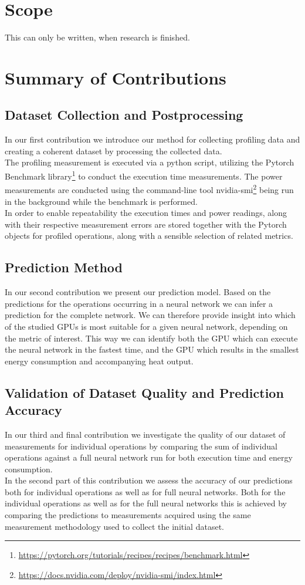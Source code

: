 \section{Scope}
This can only be written, when research is finished.


\section{Summary of Contributions}
\subsection{Dataset Collection and Postprocessing}
In our first contribution we introduce our method for collecting 
profiling data and creating a coherent dataset by processing the 
collected data.\\
The profiling measurement is executed via a python script, utilizing
the Pytorch Benchmark 
library\footnote{\url{https://pytorch.org/tutorials/recipes/recipes/benchmark.html}}
to conduct the execution time measurements. The power measurements
are conducted using the command-line tool 
nvidia-smi\footnote{\url{https://docs.nvidia.com/deploy/nvidia-smi/index.html}}
being run in the background while the benchmark is performed.\\
In order to enable repeatability the execution times and power readings,
along with their respective measurement errors are stored together with the
Pytorch objects for profiled operations, along with a sensible selection of
related metrics.

\subsection{Prediction Method}
In our second contribution we present our prediction model. Based on the predictions
for the operations occurring in a neural network we can infer a prediction for the 
complete network. We can therefore provide insight into which of the studied GPUs
is most suitable for a given neural network, depending on the metric of interest.
This way we can identify both the GPU which can execute the neural network in the
fastest time, and the GPU which results in the smallest energy consumption and
accompanying heat output.

\subsection{Validation of Dataset Quality and Prediction Accuracy}
In our third and final contribution we investigate the quality of our dataset of
measurements for individual operations by comparing the sum of individual operations
against a full neural network run for both execution time and energy consumption.\\
In the second part of this contribution we assess the accuracy of our predictions
both for individual operations as well as for full neural networks. Both for the
individual operations as well as for the full neural networks this is achieved by
comparing the predictions to measurements acquired using the same measurement
methodology used to collect the initial dataset.





